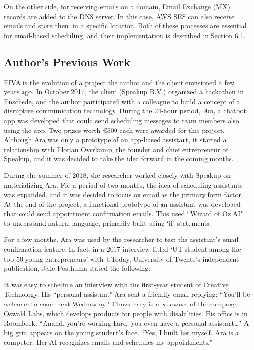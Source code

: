 \documentclass{article}
\begin{document}
On the other side, for receiving emails on a domain, Email Exchange (MX) records are added to the DNS server. In this case, AWS SES can also receive emails and store them in a specific location. Both of these processes are essential for email-based scheduling, and their implementation is described in Section 6.1.

\subsection{Author's Previous Work}

EIVA is the evolution of a project the author and the client envisioned a few years ago. In October 2017, the client (Speakup B.V.) organized a hackathon in Enschede, and the author participated with a colleague to build a concept of a disruptive communication technology. During the 24-hour period, \emph{Ara}, a chatbot app was developed that could send scheduling messages to team members also using the app. Two prizes worth €500 each were awarded for this project. Although Ara was only a prototype of an app-based assistant, it started a relationship with Florian Overkamp, the founder and chief entrepreneur of Speakup, and it was decided to take the idea forward in the coming months.

During the summer of 2018, the researcher worked closely with Speakup on materializing Ara. For a period of two months, the idea of scheduling assistants was expanded, and it was decided to focus on email as the primary form factor. At the end of the project, a functional prototype of an assistant was developed that could send appointment confirmation emails. This used ``Wizard of Oz AI" to understand natural language, primarily built using `if' statements.

For a few months, Ara was used by the researcher to test the assistant's email confirmation feature. In fact, in a 2017 interview titled `UT student among the top 50 young entrepreneurs' with UToday, University of Twente's independent publication, Jelle Posthuma stated the following:

\begin{displayquote}
	It was easy to schedule an interview with the first-year student of Creative Technology. His ``personal assistant" Ara sent a friendly email replying: ``You’ll be welcome to come next Wednesday." Chowdhary is a co-owner of the company Oswald Labs, which develops products for people with disabilities. His office is in Roombeek. ``Anand, you’re working hard: you even have a personal assistant…" A big grin appears on the young student’s face. ``Yes, I built her myself. Ara is a computer. Her AI recognizes emails and schedules my appointments." \cite{noauthor_ut_nodate}
\end{displayquote}
\end{document}
